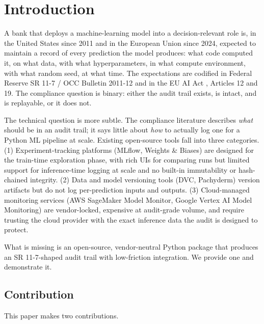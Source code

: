\section{Introduction}\label{sec:intro}

A bank that deploys a machine-learning model into a decision-relevant role is, in the United States since 2011 and in the European Union since 2024, expected to maintain a record of every prediction the model produces: what code computed it, on what data, with what hyperparameters, in what compute environment, with what random seed, at what time. The expectations are codified in Federal Reserve SR 11-7 / OCC Bulletin 2011-12 \citep{FedSR117, OCC2011} and in the EU AI Act \citep{EUAIAct}, Articles 12 and 19. The compliance question is binary: either the audit trail exists, is intact, and is replayable, or it does not.

The technical question is more subtle. The compliance literature describes \emph{what} should be in an audit trail; it says little about \emph{how} to actually log one for a Python ML pipeline at scale. Existing open-source tools fall into three categories. (1) Experiment-tracking platforms (MLflow, Weights \& Biases) are designed for the train-time exploration phase, with rich UIs for comparing runs but limited support for inference-time logging at scale and no built-in immutability or hash-chained integrity. (2) Data and model versioning tools (DVC, Pachyderm) version artifacts but do not log per-prediction inputs and outputs. (3) Cloud-managed monitoring services (AWS SageMaker Model Monitor, Google Vertex AI Model Monitoring) are vendor-locked, expensive at audit-grade volume, and require trusting the cloud provider with the exact inference data the audit is designed to protect.

What is missing is an open-source, vendor-neutral Python package that produces an SR 11-7-shaped audit trail with low-friction integration. We provide one and demonstrate it.

\subsection{Contribution}

This paper makes two contributions.

